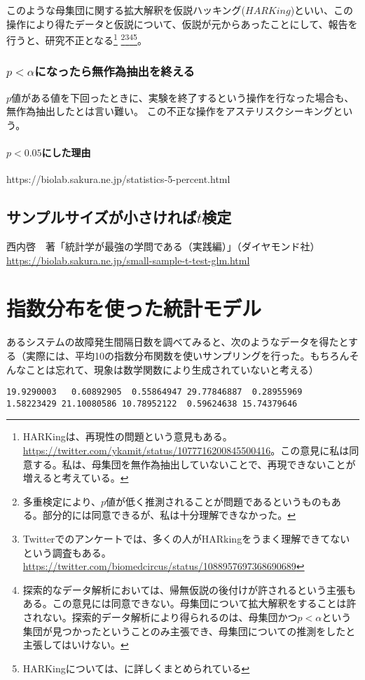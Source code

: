 \documentclass[a4paper,11pt,dvipdfmx]{jsarticle}
\begin{document}
このような母集団に関する拡大解釈を仮説ハッキング($HARKing$)といい、この操作により得たデータと仮説について、仮説が元からあったことにして、報告を行うと、研究不正となる\footnote{
    HARKingは、再現性の問題という意見もある。
    \url{https://twitter.com/ykamit/status/1077716200845500416}。この意見に私は同意する。私は、母集団を無作為抽出していないことで、再現できないことが増えると考えている。
}
\footnote{
    多重検定により、$p$値が低く推測されることが問題であるというものもある\cite{池田_功毅2016,中村_大輝2021sp20016}。部分的には同意できるが、私は十分理解できなかった。
}\footnote{
    Twitterでのアンケートでは、多くの人がHARkingをうまく理解できてないという調査もある。
    \url{https://twitter.com/biomedcircus/status/1088957697368690689}
}\footnote{
    探索的なデータ解析においては、帰無仮説の後付けが許されるという主張もある。この意見には同意できない。母集団について拡大解釈をすることは許されない。探索的データ解析により得られるのは、母集団かつ$p<\alpha$という集団が見つかったということのみ主張でき、母集団についての推測をしたと主張してはいけない。
}\footnote{
    HARKingについては、\cite{kerr1998harking}に詳しくまとめられている
}。


\subsubsection{$p<\alpha$になったら無作為抽出を終える}
$p$値がある値を下回ったときに、実験を終了するという操作を行なった場合も、無作為抽出したとは言い難い。
この不正な操作をアステリスクシーキングという。




\paragraph{$p<0.05$にした理由}
https://biolab.sakura.ne.jp/statistics-5-percent.html
\fi



\subsection{サンプルサイズが小さければ$t$検定}
西内啓　著「統計学が最強の学問である（実践編）」（ダイヤモンド社）
\url{https://biolab.sakura.ne.jp/small-sample-t-test-glm.html}
\fi 

\section{指数分布を使った統計モデル}
あるシステムの故障発生間隔日数を調べてみると、次のようなデータを得たとする（実際には、平均10の指数分布関数を使いサンプリングを行った。もちろんそんなことは忘れて、現象は数学関数により生成されていないと考える）
\begin{lstlisting}
19.9290003   0.60892905  0.55864947 29.77846887  0.28955969  1.58223429 21.10080586 10.78952122  0.59624638 15.74379646
\end{lstlisting}
\end{document}
